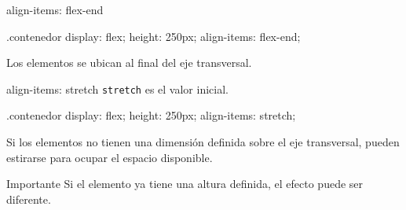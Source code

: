 \documentclass[aspectratio=169,11.5pt]{beamer}
\begin{document}
    \begin{frame}[fragile]{align-items: flex-end}
        \begin{csscodedark}
            .contenedor {
                display: flex;
                height: 250px;
                align-items: flex-end;
            }
        \end{csscodedark}

        \begin{center}
        \end{center}

        Los elementos se ubican al final
        del eje transversal.
    \end{frame}

    \begin{frame}[fragile]{align-items: stretch}
        \texttt{stretch} es el valor inicial.

        \begin{csscodedark}
            .contenedor {
                display: flex;
                height: 250px;
                align-items: stretch;
            }
        \end{csscodedark}

        Si los elementos no tienen una dimensión
        definida sobre el eje transversal,
        pueden estirarse para ocupar el espacio disponible.

        \begin{alertblock}{Importante}
            Si el elemento ya tiene una altura definida,
            el efecto puede ser diferente.
        \end{alertblock}
    \end{frame}
\end{document}
